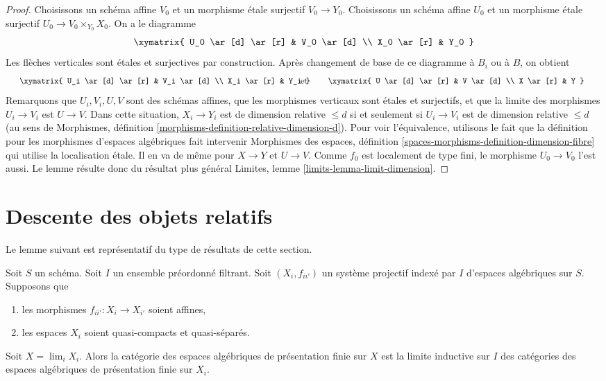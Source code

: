 \begin{proof}
Choisissons un schéma affine $V_0$ et un morphisme étale surjectif
$V_0 \to Y_0$. Choisissons un schéma affine $U_0$ et un morphisme étale
surjectif $U_0 \to V_0 \times_{Y_0} X_0$. On a le diagramme
$$
\xymatrix{
U_0 \ar[d] \ar[r] & V_0 \ar[d] \\
X_0 \ar[r] & Y_0
}
$$
Les flèches verticales sont étales et surjectives par construction.
Après changement de base de ce diagramme à $B_i$ ou à $B$, on obtient
$$
\vcenter{
\xymatrix{
U_i \ar[d] \ar[r] & V_i \ar[d] \\
X_i \ar[r] & Y_i
}
}
\quad\text{et}\quad
\vcenter{
\xymatrix{
U \ar[d] \ar[r] & V \ar[d] \\
X \ar[r] & Y
}
}
$$
Remarquons que $U_i, V_i, U, V$ sont des schémas affines,
que les morphismes verticaux sont étales et surjectifs, et que la limite des
morphismes $U_i \to V_i$ est $U \to V$.
Dans cette situation, $X_i \to Y_i$ est de dimension relative $\leq d$
si et seulement si $U_i \to V_i$ est de dimension relative $\leq d$
(au sens de Morphismes, définition
\ref{morphisms-definition-relative-dimension-d}).
Pour voir l'équivalence, utilisons le fait que la définition pour les morphismes
d'espaces algébriques fait intervenir Morphismes des espaces, définition
\ref{spaces-morphisms-definition-dimension-fibre}
qui utilise la localisation étale. Il en va de même pour $X \to Y$ et $U \to V$.
Comme $f_0$ est localement de type fini, le morphisme $U_0 \to V_0$ l'est aussi.
Le lemme résulte donc du résultat plus général
Limites, lemme \ref{limits-lemma-limit-dimension}.
\end{proof}














\section{Descente des objets relatifs}
\label{section-descending-relative}

\noindent
Le lemme suivant est représentatif du type de résultats de cette section.

\begin{lemma}
\label{lemma-descend-finite-presentation}
Soit $S$ un schéma. Soit $I$ un ensemble préordonné filtrant.
Soit $(X_i, f_{ii'})$ un système projectif indexé par $I$ d'espaces algébriques
sur $S$. Supposons que
\begin{enumerate}
\item les morphismes $f_{ii'} : X_i \to X_{i'}$ soient affines,
\item les espaces $X_i$ soient quasi-compacts et quasi-séparés.
\end{enumerate}
Soit $X = \lim_i X_i$. Alors la catégorie des espaces algébriques
de présentation finie sur $X$ est la limite inductive sur $I$ des
catégories des espaces algébriques de présentation finie sur $X_i$.
\end{lemma}

